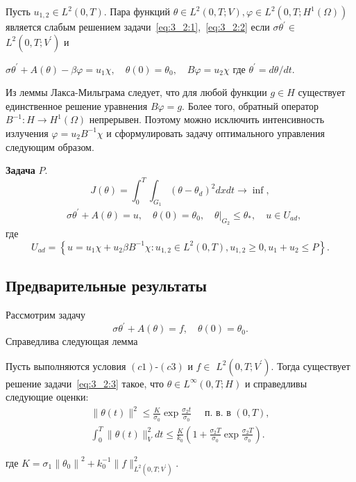 \begin{definition}
    Пусть $u_{1,2} \in L^{2}(0, T)$.
    Пара функций $\theta \in L^{2}(0, T ; V), \varphi \in L^{2}\left(0, T ; H^{1}(\Omega)\right)$
    является слабым решением задачи~\eqref{eq:3_2:1},~\eqref{eq:3_2:2}
    если $\sigma \theta^{\prime} \in$ $L^{2}\left(0, T ; V^{\prime}\right)$ и

    $\sigma \theta^{\prime}+A(\theta)-\beta \varphi=u_{1} \chi, \quad \theta(0)=\theta_{0},
    \quad B \varphi=u_{2} \chi$ где $\theta^{\prime}=d \theta / d t$.
\end{definition}

Из леммы Лакса-Мильграма следует, что для любой функции $g \in H$
существует единственное решение уравнения $B \varphi=g$.
Более того, обратный оператор $B^{-1}: H \rightarrow H^{1}(\Omega)$ непрерывен.
Поэтому можно исключить интенсивность излучения $\varphi=u_{2} B^{-1} \chi$ и
сформулировать задачу оптимального управления следующим образом.


\textbf{Задача} $P$.
\[
    J(\theta)=\int_{0}^{T}
    \int_{G_{1}}\left(\theta-\theta_{d}\right)^{2} d x d t \rightarrow \inf,
\]
\[
    \begin{aligned}
        & \sigma \theta^{\prime}+A(\theta)=u,
        \quad \theta(0)=\theta_{0},\left.\quad
        \theta\right|_{G_{2}} \leq \theta_{*},
        \quad u \in U_{a d},
    \end{aligned}
\]
где
\[
    U_{a d}=\left\{u=u_{1} \chi+u_{2} \beta B^{-1}
    \chi: u_{1,2} \in L^{2}(0, T),\right.
    \left.u_{1,2} \geq 0, u_{1}+u_{2} \leq P\right\}.
\]

\subsection{Предварительные результаты}
\label{subsec:ch3:sec2:subsec4}
Рассмотрим задачу
\begin{equation}
    \label{eq:3_2:3}
    \sigma \theta^{\prime}+A(\theta)=f, \quad \theta(0)=\theta_{0}.
\end{equation}
Справедлива следующая лемма

\begin{lemma}
    \label{lm:3_2:1}
    Пусть выполняются условия $(c1)$-$(c3)$ и
    $f \in$ $L^{2}\left(0, T ; V^{\prime}\right)$.
    Тогда существует решение задачи~\eqref{eq:3_2:3} такое, что
    $\theta \in L^{\infty}(0, T ; H)$ и справедливы следующие оценки:
    \[
        \begin{gathered}
            \|\theta(t)\|^{2} \leq \frac{K}{\sigma_{0}} \exp \frac{\sigma_{2} t}{\sigma_{0}}
            \quad \text { п.\ в. в }(0, T), \\
            \int_{0}^{T}\|\theta(t)\|_{V}^{2} d t \leq
            \frac{K}{k_{0}}\left(1+\frac{\sigma_{2} T}{\sigma_{0}} \exp
            \frac{\sigma_{2} T}{\sigma_{0}}\right).
        \end{gathered}
    \]

    где $K=\sigma_{1}\left\|\theta_{0}\right\|^{2}
    + k_{0}^{-1}\|f\|_{L^{2}\left(0, T; V^{\prime}\right)}^{2}$.
\end{lemma}


